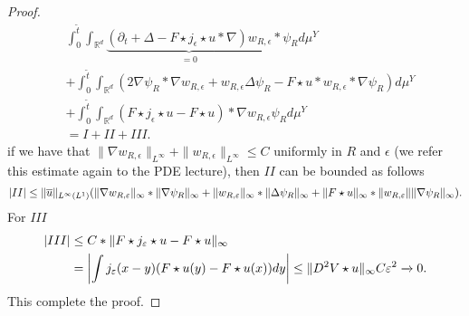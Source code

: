 \begin{proof}
\begin{align*}
  &\int_{0}^{\tilde{t} } \int_{\mathbb{R}^{d} } \underbrace{(\partial_t  + \Delta -  F \star j_{\epsilon} \star u * \nabla) w_{R,\epsilon}}_{=0}*\psi_{R} d\mu^Y \\
  &+  \int_0^{\tilde{t} } \int_{\mathbb{R}^{d} } (2 \nabla \psi_R * \nabla w_{R,\epsilon} + w_{R,\epsilon} \Delta \psi_{R} - F \star  u *w_{R,\epsilon}*\nabla \psi_{R}) d\mu^Y \\
  &+ \int_0^{\tilde{t} } \int_{\mathbb{R}^{d} } ( F \star  j_{\epsilon} \star  u - F \star  u) * \nabla w_{R,\epsilon}\psi_{R} d\mu^Y\\
  &= I + II + III
.\end{align*}
if we have that $\|\nabla w_{R,\epsilon}\|_{L^{\infty} } + \|w_{R,\epsilon}\|_{L^{\infty} } \le  C$ uniformly in $R$ and $\epsilon$ (we refer this estimate again to the PDE lecture),
then $II$ can be bounded as follows
\begin{align*}
  \abs{II}\le \|\overline{u}\|_{L^{\infty}(L^{1} ) } (\|\nabla w_{R,\epsilon}\|_{\infty}*\|\nabla \psi_R\|_{\infty}+\|w_{R,\epsilon}\|_{\infty}*\|\Delta  \psi_R\|_{\infty} +\|F\star  u\|_{\infty} * \|w_{R,\epsilon}\|\|\nabla \psi_R\|_{\infty})
.\end{align*}
For $III$ 
\begin{align*}
  \abs{III}&\le C*\|F \star  j_{\epsilon} \star u - F \star  u \|_{\infty} \\
           &= \abs*{\int j_{\epsilon}(x-y)(F \star  u (y) - F \star  u(x)) dy}\le  \|D^2 V \star  u \|_{\infty} C \epsilon ^2 \xrightarrow{} 0
.\end{align*}
This complete the proof.
\end{proof}